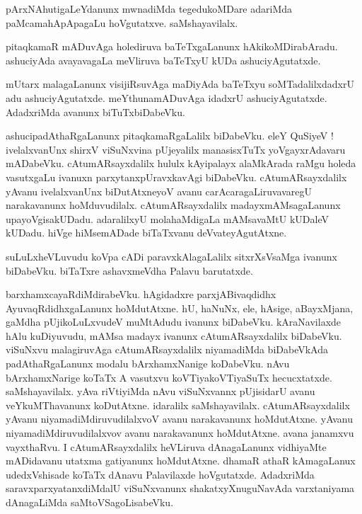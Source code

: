 \documentclass{article}
\begin{document}
\begin{mn}%
pArxNAhutigaLeYdanunx mwnadiMda tegedukoMDare adariMda paMcamahApApagaLu hoVgutatxve. saMshayavilalx.
\end{mn}

\begin{mn}%
pitaqkamaR mADuvAga holediruva baTeTxgaLanunx hAkikoMDirabAradu. ashuciyAda avayavagaLa meVliruva 
baTeTxyU kUDa ashuciyAgutatxde.
\end{mn}

\begin{mn}%
mUtarx malagaLanunx visijiRsuvAga maDiyAda baTeTxyu soMTadalilxdadxrU adu ashuciyAgutatxde. 
meYthunamADuvAga idadxrU ashuciyAgutatxde. AdadxriMda avanunx biTuTxbiDabeVku.
\end{mn}

\begin{mn}%
ashucipadAthaRgaLanunx pitaqkamaRgaLalilx biDabeVku. eleY QuSiyeV ! ivelalxvanUnx shirxV viSuNxvina 
pUjeyalilx manasisxTuTx yoVgayxrAdavaru mADabeVku. cAtumARsayxdalilx hululx kAyipalayx alaMkArada 
raMgu holeda vasutxgaLu ivanuxn parxytanxpUravxkavAgi biDabeVku. cAtumARsayxdalilx yAvanu 
ivelalxvanUnx biDutAtxneyoV avanu carAcaragaLiruvavaregU narakavanunx hoMduvudilalx. 
cAtumARsayxdalilx madayxmAMsagaLanunx upayoVgisakUDadu. adaralilxyU molahaMdigaLa mAMsavaMtU 
kUDaleV kUDadu. hiVge hiMsemADade biTaTxvanu deVvateyAgutAtxne.
\end{mn}

\begin{mn}%
suLuLxheVLuvudu koVpa cADi paravxkAlagaLalilx sitxrXsVsaMga ivanunx biDabeVku. biTaTxre 
ashavxmeVdha Palavu barutatxde.
\end{mn}

\begin{mn}%
barxhamxcayaRdiMdirabeVku. hAgidadxre parxjABivaqdidhx AyuvaqRdidhxgaLanunx hoMdutAtxne. hU, 
haNuNx, ele, hAsige, aBayxMjana, gaMdha pUjikoLuLxvudeV muMtAdudu ivanunx biDabeVku. kAraNavilaxde 
hAlu kuDiyuvudu, mAMsa madayx ivanunx cAtumARsayxdalilx biDabeVku. viSuNxvu malagiruvAga 
cAtumARsayxdalilx niyamadiMda biDabeVkAda padAthaRgaLanunx modalu bArxhamxNanige koDabeVku. nAvu 
bArxhamxNarige koTaTx A vasutxvu koVTiyakoVTiyaSuTx hecucxtatxde. saMshayavilalx. yAva riVtiyiMda 
nAvu viSuNxvannx pUjisidarU avanu veYkuMThavanunx koDutAtxne. idaralilx saMshayavilalx. 
cAtumARsayxdalilx yAvanu niyamadiMdiruvudilalxvoV avanu narakavanunx hoMdutAtxne. yAvanu 
niyamadiMdiruvudilalxvov avanu narakavanunx hoMdutAtxne. avana janamxvu vayxthaRvu. I 
cAtumARsayxdalilx heVLiruva dAnagaLanunx vidhiyaMte mADidavanu utatxma gatiyanunx hoMdutAtxne. 
dhamaR athaR kAmagaLanux udedxVshisade koTaTx dAnavu Palavilaxde hoVgutatxde. AdadxriMda 
saravxparxyatanxdiMdalU viSuNxvanunx shakatxyXnuguNavAda varxtaniyama dAnagaLiMda 
saMtoVSagoLisabeVku.
\end{mn}
\end{document}
